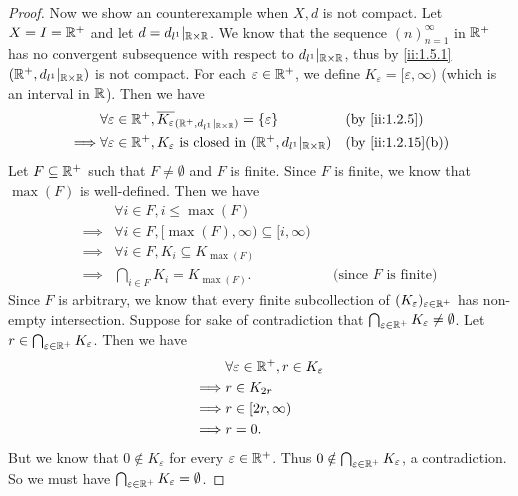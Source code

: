 \begin{proof}
  Now we show an counterexample when \(X, d\) is not compact.
  Let \(X = I = \mathbb{R}^+\) and let \(d = d_{l^1}|_{\mathbb{R} \times \mathbb{R}}\).
  We know that the sequence \((n)_{n = 1}^\infty\) in \(\mathbb{R}^+\) has no convergent subsequence with respect to \(d_{l^1}|_{\mathbb{R} \times \mathbb{R}}\), thus by \cref{ii:1.5.1} \((\mathbb{R}^+, d_{l^1}|_{\mathbb{R} \times \mathbb{R}})\) is not compact.
  For each \(\varepsilon \in \mathbb{R}^+\), we define \(K_\varepsilon = [\varepsilon, \infty)\) (which is an interval in \(\mathbb{R}\)).
  Then we have
  \begin{align*}
             & \forall \varepsilon \in \R^+, \overline{K_\varepsilon}_{(\R^+, d_{l^1}|_{\R \times \R})} = \set{\varepsilon} &  & \by{ii:1.2.5}     \\
    \implies & \forall \varepsilon \in \R^+, K_\varepsilon \text{ is closed in } (\R^+, d_{l^1}|_{\R \times \R})            &  & \by{ii:1.2.15}[b]
  \end{align*}
  Let \(F \subseteq \mathbb{R}^+\) such that \(F \neq \emptyset\) and \(F\) is finite.
  Since \(F\) is finite, we know that \(\max(F)\) is well-defined.
  Then we have
  \begin{align*}
             & \forall i \in F, i \leq \max(F)                                                              \\
    \implies & \forall i \in F, [\max(F), \infty) \subseteq [i, \infty)                                     \\
    \implies & \forall i \in F, K_i \subseteq K_{\max(F)}                                                   \\
    \implies & \bigcap_{i \in F} K_i = K_{\max(F)}.                     &  & \text{(since \(F\) is finite)}
  \end{align*}
  Since \(F\) is arbitrary, we know that every finite subcollection of \((K_\varepsilon)_{\varepsilon \in \mathbb{R}^+}\) has non-empty intersection.
  Suppose for sake of contradiction that \(\bigcap_{\varepsilon \in \mathbb{R}^+} K_\varepsilon \neq \emptyset\).
  Let \(r \in \bigcap_{\varepsilon \in \mathbb{R}^+} K_\varepsilon\).
  Then we have
  \begin{align*}
             & \forall \varepsilon \in \mathbb{R}^+, r \in K_\varepsilon \\
    \implies & r \in K_{2r}                                      \\
    \implies & r \in [2r, \infty)                                \\
    \implies & r = 0.
  \end{align*}
  But we know that \(0 \notin K_\varepsilon\) for every \(\varepsilon \in \mathbb{R}^+\).
  Thus \(0 \notin \bigcap_{\varepsilon \in \mathbb{R}^+} K_\varepsilon\), a contradiction.
  So we must have \(\bigcap_{\varepsilon \in \mathbb{R}^+} K_\varepsilon = \emptyset\).
\end{proof}
